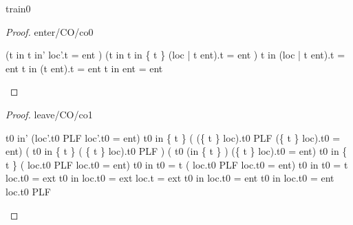 \documentclass[12pt]{amsart}
\begin{document}
\begin{machine}{train0}
\begin{proof}{enter/CO/co0}
	\begin{calculation}
	\hint{=}{  }
	\hint{=}{ }
	\land	{}
	\hint{=}{ }
		(\neg t \in in \land t \in in' \implies  loc'.t = ent )
	\land	{}
		(\neg t \in in \land t \in in \bunion \{ t \} \implies  (loc | t \tfun ent).t = ent )
	\hint{=}{  }
		\neg t \in in \implies  (loc | t \tfun ent).t = ent 
	\hint{=}{  }
		\neg t \in in \implies  (t \tfun ent).t = ent 
	\hint{=}{  }
		\neg t \in in \implies  ent = ent 
	\hint{=}{  }
		\true
	\end{calculation}
\end{proof}

\begin{proof}{leave/CO/co1}
	\begin{calculation}
		t0 \in in' \land (loc'.t0 \in PLF \lor loc'.t0 = ent)
		t0 \in in \setminus \{ t \} 
		\land ( (\{ t \} \domsub loc).t0 \in PLF \lor (\{ t \} \domsub loc).t0 = ent)
	\hint{=}{ }	%
		( t0 \in in \setminus \{ t \} 
		\land  ( \{ t \} \domsub loc).t0 \in PLF )
			   \lor ( t0 \in (in \setminus \{ t \} )
		\land (\{ t \} \domsub loc).t0 = ent)
	\hint{=}{ \ref{inv2} }	%
			t0 \in in \setminus \{ t \} 
		\land ( loc.t0 \in PLF \lor  loc.t0 = ent)
	\hint{=}{ } %
		t0 \in in \land \neg t0  = t 
		\land ( loc.t0 \in PLF \lor  loc.t0 = ent)
	\hint{=}{  } %
		t0 \in in \land \neg t0  = t \land \neg loc.t0 = ext
	\hint{=}{  \ref{grd0} } %
	 	t0 \in in \land \neg loc.t0 = ext \land loc.t = ext
	\hint{\follows}{  \ref{grd0} } %
	 	t0 \in in \land loc.t0 = ent 
	\hint{=}{   } %
	 	t0 \in in \land loc.t0 = ent  \land \neg loc.t0 \in PLF 
	\end{calculation}
\end{proof}


\end{machine}
\end{document}
